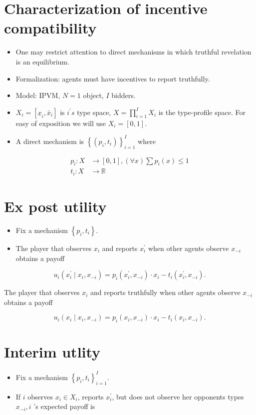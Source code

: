 \documentclass[10pt]{article}
\begin{document}
\section*{Characterization of incentive compatibility}
\begin{itemize}
  \item One may restrict attention to direct mechanisms in which truthful revelation is an equilibrium.
  \item Formalization: agents must have incentives to report truthfully.
  \item Model: IPVM, $N=1$ object, $I$ bidders.
  \item $X_{i}=\left[\underline{x}_{i}, \bar{x}_{i}\right]$ is $i^{\prime} s$ type space, $X=\prod_{i=1}^{I} X_{i}$ is the type-profile space. For easy of exposition we will use $X_{i}=[0,1]$.
  \item A direct mechanism is $\left\{\left(p_{i}, t_{i}\right)\right\}_{i=1}^{I}$ where
\end{itemize}

$$
\begin{aligned}
p_{i}: X & \rightarrow[0,1],(\forall x) \sum p_{i}(x) \leq 1 \\
t_{i}: X & \rightarrow \mathbb{R}
\end{aligned}
$$

\section*{Ex post utility}
\begin{itemize}
  \item Fix a mechanism $\left\{p_{i}, t_{i}\right\}$.
  \item The player that observes $x_{i}$ and reports $x_{i}^{\prime}$ when other agents observe $x_{-i}$ obtains a payoff
\end{itemize}

$$
u_{i}\left(x_{i}^{\prime} \mid x_{i}, x_{-i}\right)=p_{i}\left(x_{i}^{\prime}, x_{-i}\right) \cdot x_{i}-t_{i}\left(x_{i}^{\prime}, x_{-i}\right) .
$$

The player that observes $x_{i}$ and reports truthfully when other agents observe $x_{-i}$ obtains a payoff

$$
u_{i}\left(x_{i} \mid x_{i}, x_{-i}\right)=p_{i}\left(x_{i}, x_{-i}\right) \cdot x_{i}-t_{i}\left(x_{i}, x_{-i}\right) .
$$

\section*{Interim utlity}
\begin{itemize}
  \item Fix a mechanism $\left\{p_{i}, t_{i}\right\}_{i=1}^{I}$.
  \item If $i$ observes $x_{i} \in X_{i}$, reports $x_{i}^{\prime}$, but does not observe her opponents types $x_{-i}, i$ 's expected payoff is
\end{itemize}
\end{document}
